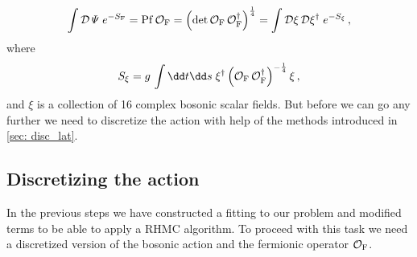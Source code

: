%
%
\begin{equation}
\int \mathcal{D}\mathit{\Psi}\; e^{-S_{\rm F}} = {\rm Pf}\,\mathcal{O}_{\rm F} =\left( \det \mathcal{O}_{\rm F}\,\mathcal{O}_{\rm F}^{\dagger} \right)^{\frac{1}{4}} = \int \mathcal{D}\xi\,\mathcal{D}\xi^{\dagger}\; e^{-S_{\xi}}\,,
\end{equation}
%
%
where
%
%
\begin{equation}
S_{\xi} = g\,\int \dd t\dd s \; \xi^{\dagger} \left(\mathcal{O}_{\rm F}\,\mathcal{O}_{\rm F}^{\dagger} \right)^{-\frac{1}{4}} \xi \,,
\end{equation}
and $\xi$ is a collection of 16 complex bosonic scalar fields. But before we can go any further we need to discretize the action with help of the methods introduced in \autoref{sec: disc_lat}. 
%
%
%
%
%
%
%
%
%
%
\subsection{Discretizing the action}
In the previous steps we have constructed a  fitting to our problem and modified terms to be able to apply a RHMC algorithm. To proceed with this task we need a discretized version of the bosonic action and the fermionic operator $\mathcal{O}_{\rm F}$. 
%
%
%
%
%
%
